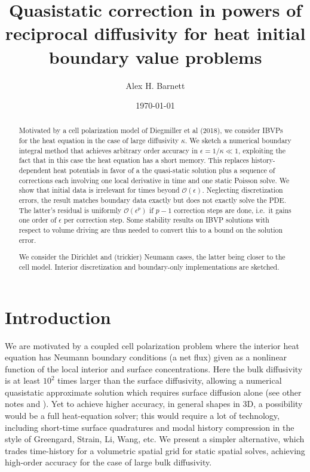 \documentclass[10pt]{article}
\newcommand{\bigO}{{\mathcal O}}
\newcommand{\eps}{\epsilon}
\begin{document}
\title{Quasistatic correction in powers of reciprocal diffusivity for heat initial boundary value problems}

\author{Alex H. Barnett}
\date{\today}
\maketitle

\begin{abstract}
  Motivated by a cell polarization model of Diegmiller et al (2018),
  we consider IBVPs for the heat equation
  in the case of large diffusivity $\kappa$.
  We sketch a numerical boundary integral method that achieves
  arbitrary order accuracy in $\eps = 1/\kappa \ll 1$,
  exploiting the fact that in this case the heat equation has a short memory.
  This replaces history-dependent heat potentials in favor of a
  the quasi-static solution plus a sequence of corrections each involving
  one local derivative in time and one static Poisson solve.
  We show that initial data is irrelevant for times beyond $\bigO(\eps)$.
  Neglecting discretization errors, the 
  result matches boundary data exactly but does not exactly solve the PDE.
  The latter's residual is uniformly $\bigO(\eps^p)$
  if $p-1$ correction steps are done, i.e.\ it gains one order of $\eps$
  per correction step.
  Some stability results on IBVP solutions with respect to volume driving
  are thus needed to convert this to a bound on the solution error.

  We consider the Dirichlet and (trickier) Neumann cases,
  the latter being closer to the cell model.
  Interior discretization and boundary-only implementations are sketched.
\end{abstract}

\section{Introduction}

We are motivated by a coupled cell polarization problem \cite{diegmiller18}
where the interior heat equation has Neumann boundary conditions
(a net flux) given as a nonlinear function of the local interior and surface concentrations.
Here the bulk diffusivity is at least $10^2$ times larger than the surface diffusivity, allowing a
numerical quasistatic approximate solution which
requires surface diffusion alone (see other notes and \cite{diegmiller18}).
Yet to achieve higher accuracy, in general shapes in 3D,
a possibility would be a full heat-equation solver; this would require
a lot of technology, including short-time surface quadratures and modal history compression in the style of Greengard, Strain, Li, Wang, etc.
We present a simpler alternative, which trades time-history for
a volumetric spatial grid for static spatial solves, achieving high-order
accuracy for the case of large bulk diffusivity.
\end{document}
